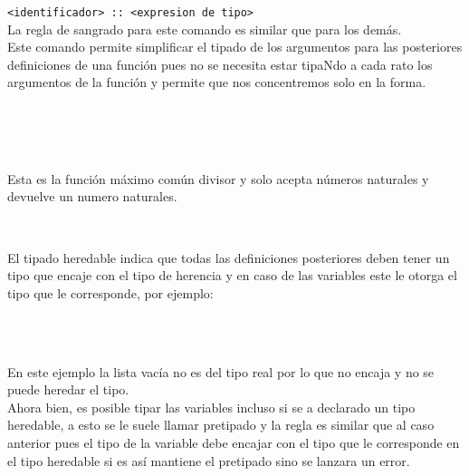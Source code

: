       \texttt{<identificador>~::~<expresion de tipo>}
      \\
      
      La regla de sangrado para este comando es similar que para los demás.
      \\
      
      Este comando permite simplificar el tipado de los argumentos para las posteriores definiciones de una función pues no se necesita estar tipaNdo a cada rato los argumentos de la función y permite que nos concentremos solo en la forma.
      
      \begin{fxcode}
         \\
         \\
         \\
      \end{fxcode}
      
      Esta es la función máximo común divisor y solo acepta números naturales y devuelve un numero naturales.
      
      \begin{fxcode}
         \\
      \end{fxcode}
      
      El tipado heredable indica que todas las definiciones posteriores deben tener un tipo que encaje con el tipo de herencia y en caso de las variables este le otorga el tipo que le corresponde, por ejemplo:
      
      \begin{fxcode}
         \\
         \\
      \end{fxcode}
      
      En este ejemplo la lista vacía no es del tipo real por lo que no encaja y no se puede heredar el tipo.
      \\
      
      Ahora bien, es posible tipar las variables incluso si se a declarado un tipo heredable, a esto se le suele llamar pretipado y la regla es similar que al caso anterior pues el tipo de la variable debe encajar con el tipo que le corresponde en el tipo heredable si es así mantiene el pretipado sino se lanzara un error.
      
